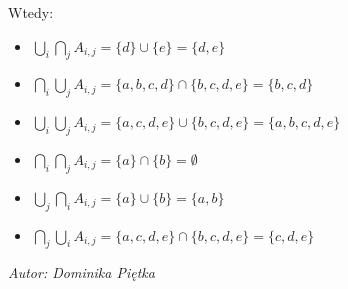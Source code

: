 \documentclass[a4paper, hidelinks, 12pt]{article}
\begin{document}
Wtedy:
\begin{itemize}
    \item $\bigcup_{i} \bigcap_{j} A_{i,j} = \{d\} \cup \{e\} = \{d, e\}$
    \item $\bigcap_{i} \bigcup_{j} A_{i,j} = \{a, b, c, d\} \cap \{b, c, d, e\} = \{b, c, d\}$
    \item $\bigcup_{i} \bigcup_{j} A_{i,j} = \{a, c, d, e\} \cup \{b, c, d, e\} = \{a, b, c, d, e\}$
    \item $\bigcap_{i} \bigcap_{j} A_{i,j} = \{a\} \cap \{b\} = \emptyset$
    \item $\bigcup_{j} \bigcap_{i} A_{i,j} = \{a\} \cup \{b\} = \{a, b\} $
    \item $\bigcap_{j} \bigcup_{i} A_{i,j} = \{a, c, d, e\} \cap \{b, c, d, e\} = \{c, d, e\}$
\end{itemize}






\textit{Autor: Dominika Piętka}\\
\end{document}
